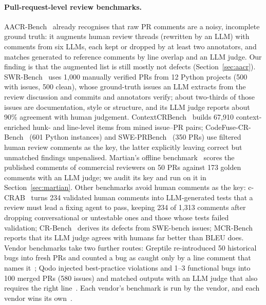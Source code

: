 \documentclass[11pt,a4paper]{article}
\begin{document}
\paragraph{Pull-request-level review benchmarks.} AACR-Bench~\cite{aacrbench,aacrrepo}
already recognises that raw PR comments are a noisy, incomplete ground truth:
it augments human review threads (rewritten by an LLM) with comments from six
LLMs, each kept or dropped by at least two annotators, and matches generated
to reference comments by line overlap and an LLM judge. Our finding is that
the augmented list is still mostly not defects (Section~\ref{sec:aacr}).
SWR-Bench~\cite{swrbench} uses 1{,}000 manually verified PRs from 12 Python
projects (500 with issues, 500 clean), whose ground-truth issues an LLM
extracts from the review discussion and commits and annotators verify; about
two-thirds of those issues are documentation, style or structure, and its LLM
judge reports about 90\% agreement with human judgement.
ContextCRBench~\cite{contextcrbench} builds 67{,}910 context-enriched hunk- and
line-level items from mined issue--PR pairs; CodeFuse-CR-Bench~\cite{guo2025codefusecr}
(601 Python instances) and SWE-PRBench~\cite{kumar2026sweprbench} (350 PRs)
use filtered human review comments as the key, the latter explicitly leaving
correct but unmatched findings unpenalised. Martian's offline benchmark~\cite{martianbench,martiansite}
scores the published comments of commercial reviewers on 50 PRs against 173
golden comments with an LLM judge; we audit its key and run on it in
Section~\ref{sec:martian}. Other benchmarks avoid human
comments as the key: c-CRAB~\cite{ccrab} turns 234 validated human comments
into LLM-generated tests that a review must lead a fixing agent to pass,
keeping 234 of 1{,}313 comments after dropping conversational or untestable
ones and those whose tests failed validation;
CR-Bench~\cite{pereira2026crbench} derives its defects from SWE-bench issues;
MCR-Bench~\cite{zheng2026mcrbench} reports that its LLM judge agrees with
humans far better than BLEU does. Vendor benchmarks take two further routes:
Greptile re-introduced 50 historical bugs into fresh PRs and counted a bug as
caught only by a line comment that names it~\cite{greptilebench}; Qodo
injected best-practice violations and 1--3 functional bugs into 100 merged
PRs (580 issues) and matched outputs with an LLM judge that also requires the
right line~\cite{qodobench}. Each vendor's benchmark is run by the vendor, and
each vendor wins its own~\cite{deepsourcebench}.
\end{document}
